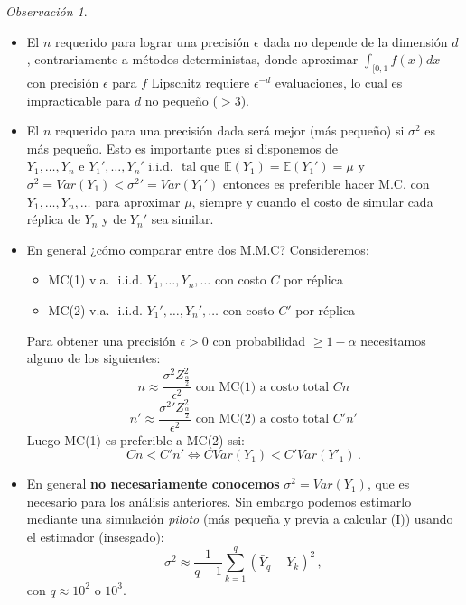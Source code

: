 \documentclass[letterpaper,11pt]{article} %
\theoremstyle{defbreak}
\theoremstyle{propbreak}
\theoremstyle{remark}
\newtheorem{remark}{Observación}[subsection]
\theoremstyle{break}
\def\ssi{\Longleftrightarrow}
\def\E{\mathbb{E}}
\def\var{Var}
\def\iid{\mbox{ i.i.d. }}
\def\tq{\mbox{ tal que }}
\def\beforeitemize{\leavevmode \vspace{-0.5\baselineskip}}
\def\nmc{\displaystyle\frac{\sigma^2 Z^2_{\frac{\alpha}{2}}}{\epsilon^2}}
\begin{document}
\begin{remark}
\beforeitemize
\begin{itemize}
    \item El $n$ requerido para lograr una precisión $\epsilon$ dada no depende de la dimensión $d$, contrariamente a métodos deterministas, donde aproximar $\int_{[0,1}f(x)dx$ con precisión $\epsilon$ para $f$ Lipschitz requiere $\epsilon^{-d}$ evaluaciones, lo cual es impracticable para $d$ no pequeño ($>3$).
    \item El $n$ requerido para una precisión dada será mejor (más pequeño) si $\sigma^2$ es más pequeño. Esto es importante pues si disponemos de $Y_1,\dots,Y_n \mbox{ e } Y_1',\dots,Y_n' \iid \tq \E(Y_1)=\E(Y_1')=\mu$ y $\sigma^2=\var(Y_1)<\sigma^2'=\var(Y_1')$ entonces es preferible hacer M.C. con $Y_1,\dots,Y_n,\dots$ para aproximar $\mu$, siempre y cuando el costo de simular cada réplica de $Y_n$ y de $Y_n'$ sea similar.
    \item En general ¿cómo comparar entre dos M.M.C?\newline
    Consideremos:
    \begin{itemize}
        \item MC(1) v.a. $\iid Y_1,\dots,Y_n,\dots$ con costo $C$ por réplica
        \item MC(2) v.a. $\iid Y_1',\dots,Y_n',\dots$ con costo $C'$ por réplica
    \end{itemize}
    Para obtener una precisión $\epsilon>0$ con probabilidad $\geq 1-\alpha$ necesitamos alguno de los siguientes:
    $$ n\approx\nmc \mbox{ con MC(1) a costo total }Cn$$
    $$ n'\approx\displaystyle\frac{\sigma^2' Z^2_{\frac{\alpha}{2}}}{\epsilon^2}\mbox{ con MC(2) a costo total }C'n'$$
    Luego MC(1) es preferible a MC(2) ssi:
    $$ Cn<C'n'\ssi C\var(Y_1)<C'\var(Y'_1) \, .$$
    \item En general \textbf{no necesariamente conocemos} $\sigma^2=\var(Y_1)$, que es necesario para los análisis anteriores.
    \newline Sin embargo podemos estimarlo mediante una simulación \textit{piloto} (más pequeña y previa a calcular (I)) usando el estimador (insesgado):
    $$ \sigma^2\approx\displaystyle\frac{1}{q-1}\sum^q_{k=1}(\bar{Y}_q-Y_k)^2 \, ,$$
    con $q\approx10^2$ o $10^3$.
\end{itemize}
\end{remark}
\end{document}
